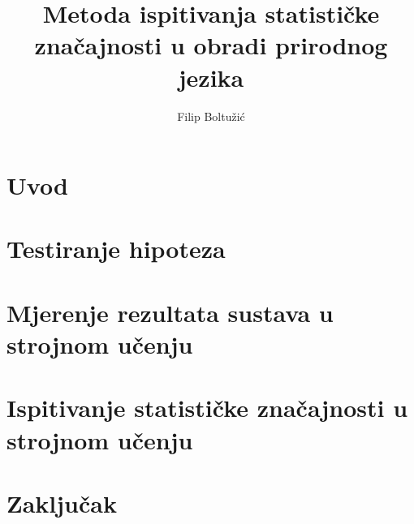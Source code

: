 \documentclass[times, utf8, seminar]{fer}
\begin{document}

\title{Metoda ispitivanja statističke značajnosti u obradi prirodnog jezika}

\author{Filip Boltužić}
\maketitle

\tableofcontents

\chapter{Uvod}


\chapter{Testiranje hipoteza}


\chapter{Mjerenje rezultata sustava u strojnom učenju}


\chapter{Ispitivanje statističke značajnosti u strojnom učenju}


\chapter{Zaključak}




\end{document}
